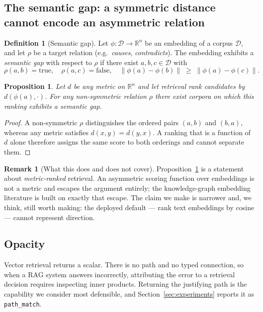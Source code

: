 \documentclass[11pt]{article}
\newtheorem{proposition}[theorem]{Proposition}
\theoremstyle{definition}
\newtheorem{definition}[theorem]{Definition}
\newtheorem{remark}[theorem]{Remark}
\begin{document}
\subsection{The semantic gap: a symmetric distance cannot encode an asymmetric relation}
\label{sec:semantic-gap}

\begin{definition}[Semantic gap]
Let $\phi:\mathcal{D}\to\mathbb{R}^n$ be an embedding of a corpus $\mathcal{D}$, and
let $\rho$ be a target relation (e.g.\ \emph{causes}, \emph{contradicts}). The
embedding exhibits a \emph{semantic gap} with respect to $\rho$ if there exist
$a,b,c\in\mathcal{D}$ with
\[
  \rho(a,b)=\text{true},\quad \rho(a,c)=\text{false},\quad
  \|\phi(a)-\phi(b)\| \;\ge\; \|\phi(a)-\phi(c)\|.
\]
\end{definition}

\begin{proposition}
\label{prop:gap}
Let $d$ be any metric on $\mathbb{R}^n$ and let retrieval rank candidates by
$d(\phi(a),\cdot)$. For any non-symmetric relation $\rho$ there exist corpora on which
this ranking exhibits a semantic gap.
\end{proposition}

\begin{proof}
A non-symmetric $\rho$ distinguishes the ordered pairs $(a,b)$ and $(b,a)$, whereas
any metric satisfies $d(x,y)=d(y,x)$. A ranking that is a function of $d$ alone
therefore assigns the same score to both orderings and cannot separate them.
\end{proof}

\begin{remark}[What this does and does not cover]
Proposition~\ref{prop:gap} is a statement about \emph{metric-ranked} retrieval. An
asymmetric scoring function over embeddings is not a metric and escapes the argument
entirely; the knowledge-graph embedding literature
\cite{bordes2013translating,trouillon2016complex,sun2019rotate} is built on exactly
that escape. The claim we make is narrower and, we think, still worth making: the
deployed default --- rank text embeddings by cosine --- cannot represent direction.
\end{remark}

\subsection{Opacity}

Vector retrieval returns a scalar. There is no path and no typed connection, so when a
RAG system answers incorrectly, attributing the error to a retrieval decision requires
inspecting inner products. Returning the justifying path is the capability we consider
most defensible, and Section~\ref{sec:experiments} reports it as \texttt{path\_match}.
\end{document}
